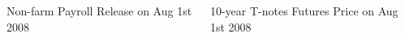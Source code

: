 \documentclass[final]{beamer}
\begin{document}
\begin{frame}
\begin{columns}[t]
\begin{column}{.53 \linewidth}
\begin{columns}[c]
\begin{column}{.48 \linewidth}
\begin{block}{Non-farm Payroll Release on Aug 1st 2008}%

\end{block}%

\end{column}
%

\begin{column}{.48 \linewidth}%

\vspace{2cm}%

\begin{block}{10-year T-notes Futures Price on Aug 1st 2008}%


\end{block}
\end{column}
\end{columns}
\end{column}
\end{columns}
\end{frame}
\end{document}
